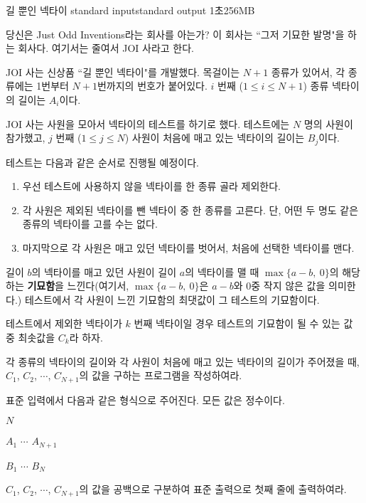 \begin{problem}{길 뿐인 넥타이}
	{standard input}{standard output}
	{1초}{256MB}{}
	
	당신은 Just Odd Inventions라는 회사를 아는가? 이 회사는 ``그저 기묘한 발명"을 하는 회사다. 여기서는 줄여서 JOI 사라고 한다.
	
	JOI 사는 신상품 ``길 뿐인 넥타이"를 개발했다. 목걸이는 $N+1$ 종류가 있어서, 각 종류에는 1번부터 $N+1$번까지의 번호가 붙어있다. $i$ 번째 ($1 \le i \le N+1$) 종류 넥타이의 길이는 $A_i$이다.
	
	JOI 사는 사원을 모아서 넥타이의 테스트를 하기로 했다. 테스트에는 $N$ 명의 사원이 참가했고, $j$ 번째 ($1 \le j \le N$) 사원이 처음에 매고 있는 넥타이의 길이는 $B_j$이다.
	
	테스트는 다음과 같은 순서로 진행될 예정이다.
	
	\begin{enumerate}
		\item 우선 테스트에 사용하지 않을 넥타이를 한 종류 골라 제외한다.
		\item 각 사원은 제외된 넥타이를 뺀 넥타이 중 한 종류를 고른다. 단, 어떤 두 명도 같은 종류의 넥타이를 고를 수는 없다.
		\item 마지막으로 각 사원은 매고 있던 넥타이를 벗어서, 처음에 선택한 넥타이를 맨다.
	\end{enumerate}

	길이 $b$의 넥타이를 매고 있던 사원이 길이 $a$의 넥타이를 맬 때 $\max\{a-b, \ 0\}$의 해당하는 \textbf{기묘함}을 느낀다(여기서, $\max\{a-b, \ 0\}$은 $a-b$와 0중 작지 않은 값을 의미한다.) 테스트에서 각 사원이 느낀 기묘함의 최댓값이 그 테스트의 기묘함이다.
	
	테스트에서 제외한 넥타이가 $k$ 번째 넥타이일 경우 테스트의 기묘함이 될 수 있는 값 중 최솟값을 $C_k$라 하자.
	
	각 종류의 넥타이의 길이와 각 사원이 처음에 매고 있는 넥타이의 길이가 주어졌을 때, $C_1$, $C_2$, $\cdots$, $C_{N+1}$의 값을 구하는 프로그램을 작성하여라.
	
	\InputFile
	
	표준 입력에서 다음과 같은 형식으로 주어진다. 모든 값은 정수이다.

	$N$
	
	$A_1$ $\cdots$ $A_{N+1}$
	
	$B_1$ $\cdots$ $B_{N}$
	
	\OutputFile
	
	$C_1$, $C_2$, $\cdots$, $C_{N+1}$의 값을 공백으로 구분하여 표준 출력으로 첫째 줄에 출력하여라.
	\Constraints
	

\end{problem}
